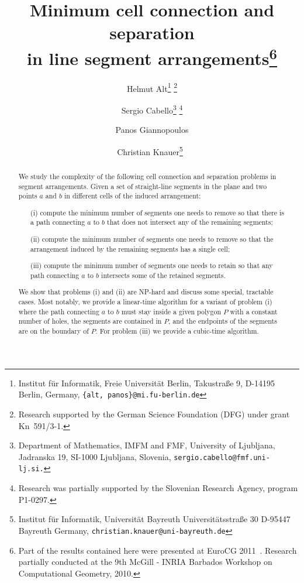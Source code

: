 \documentclass[11pt,a4paper]{article}
\begin{document}
\pagestyle{plain}

\title{Minimum cell connection and separation\\ in line segment arrangements\thanks{Part of the results contained here were presented at EuroCG 2011~\cite{acgk-11}. Research partially conducted at the 9th McGill - INRIA Barbados Workshop on Computational Geometry, 2010.}}

\author{Helmut Alt\thanks{Institut f{\"ur} Informatik, Freie Universit{\"a}t Berlin,
    Takustra{\ss}e 9, D-14195 Berlin, Germany, {\tt \{alt, panos\}@mi.fu-berlin.de}}
    \footnote{Research supported by the German Science Foundation (DFG) under grant Kn~591/3-1.}
\and
Sergio Cabello\thanks{Department of Mathematics, IMFM and FMF, University of Ljubljana,
                Jadranska 19, SI-1000 Ljubljana, Slovenia, {\tt sergio.cabello@fmf.uni-lj.si.}}
       \footnote{Research was partially supported by the Slovenian Research Agency, program P1-0297.}
\and
Panos Giannopoulos\footnotemark[2]{\ }\footnotemark[3]
\and
Christian Knauer\thanks{Institut f{\"ur} Informatik, Universit{\"a}t Bayreuth
    Universit{\"a}tsstra{\ss}e 30
    D-95447 Bayreuth
    Germany, {\tt christian.knauer@uni-bayreuth.de}}{\ }\footnotemark[2]
}
\date{}
\maketitle

\begin{abstract}
We study the complexity of the following cell connection and separation problems in segment arrangements.
Given a set of straight-line segments in the plane and two points $a$ and $b$ in different cells of the induced arrangement:
\begin{itemize}
\setlength{\itemsep}{-\parsep}
\item[(i)] compute the minimum number of segments one needs to remove so that there is a path connecting $a$ to $b$ that does not intersect any of the remaining segments;
\item[(ii)] compute the minimum number of segments one needs to remove so that the arrangement induced by the remaining segments has a single cell;
\item[(iii)] compute the minimum number of segments one needs to retain so that any path connecting $a$ to $b$ intersects some of the retained segments.
\end{itemize}

We show that problems (i) and (ii) are NP-hard and discuss some special, tractable cases. Most notably, we provide a linear-time algorithm for a variant of problem (i) where the path connecting $a$ to $b$ must stay inside a given polygon $P$ with a constant number of holes, the segments are contained in $P$, and the endpoints of the segments are on the boundary of $P$.
For problem (iii) we provide a cubic-time algorithm.
\end{abstract}
\end{document}
